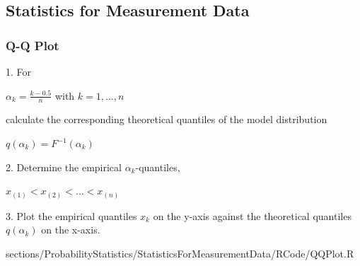 \subsection{Statistics for Measurement Data}
	\subsubsection{Q-Q Plot}
		\RTheory
		{					
			1. For
			\begin{center}
				$\alpha_k=\frac{k-0.5}{n}$ with $k=1,...,n$\\
			\end{center}
			
			calculate the corresponding theoretical quantiles of the model distribution
			
			\begin{center}
				$q(\alpha_k)=F^{-1}(\alpha_k)$\\
			\end{center}				 
			
			2. Determine the empirical $\alpha_k$-quantiles,
			
			\begin{center}
				$x_{(1)}<x_{(2)}<...<x_{(n)}$\\
			\end{center}				 
			
			3. Plot the empirical quantiles $x_k$ on the y-axis against the theoretical quantiles 					$q(\alpha_k)$ on the x-axis.		 
		}
		{
			sections/ProbabilityStatistics/StatisticsForMeasurementData/RCode/QQPlot.R
		}
		
